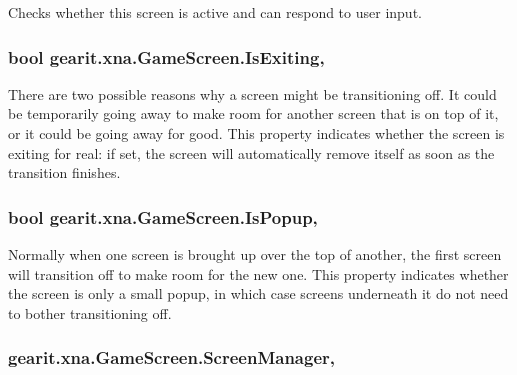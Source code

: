 Checks whether this screen is active and can respond to user input. 

\hypertarget{classgearit_1_1xna_1_1_game_screen_a30f6d7ee7a46daca6d597f55573663ee}{
\subsubsection[{Is\+Exiting}]{\setlength{\rightskip}{0pt plus 5cm}bool gearit.\+xna.\+Game\+Screen.\+Is\+Exiting\hspace{0.3cm}{\ttfamily [get]}, {\ttfamily [set]}}}\label{classgearit_1_1xna_1_1_game_screen_a30f6d7ee7a46daca6d597f55573663ee}


There are two possible reasons why a screen might be transitioning off. It could be temporarily going away to make room for another screen that is on top of it, or it could be going away for good. This property indicates whether the screen is exiting for real\+: if set, the screen will automatically remove itself as soon as the transition finishes. 

\hypertarget{classgearit_1_1xna_1_1_game_screen_aed379623ce9eda3c3e28daf2ff75cb3e}{
\subsubsection[{Is\+Popup}]{\setlength{\rightskip}{0pt plus 5cm}bool gearit.\+xna.\+Game\+Screen.\+Is\+Popup\hspace{0.3cm}{\ttfamily [get]}, {}}}\label{classgearit_1_1xna_1_1_game_screen_aed379623ce9eda3c3e28daf2ff75cb3e}


Normally when one screen is brought up over the top of another, the first screen will transition off to make room for the new one. This property indicates whether the screen is only a small popup, in which case screens underneath it do not need to bother transitioning off. 

\hypertarget{classgearit_1_1xna_1_1_game_screen_abdb61d4604bd77d49cb338acdc1c266c}{
\subsubsection[{Screen\+Manager}]{ gearit.\+xna.\+Game\+Screen.\+Screen\+Manager\hspace{0.3cm}{\ttfamily [get]}, {\ttfamily [set]}}}\label{classgearit_1_1xna_1_1_game_screen_abdb61d4604bd77d49cb338acdc1c266c}


